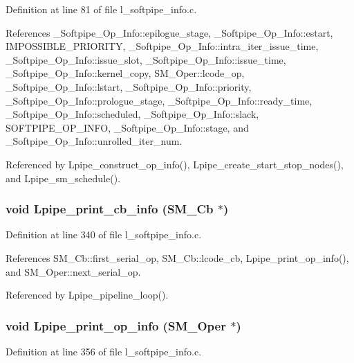Definition at line 81 of file l\_\-softpipe\_\-info.c.

References \_\-Softpipe\_\-Op\_\-Info::epilogue\_\-stage, \_\-Softpipe\_\-Op\_\-Info::estart, IMPOSSIBLE\_\-PRIORITY, \_\-Softpipe\_\-Op\_\-Info::intra\_\-iter\_\-issue\_\-time, \_\-Softpipe\_\-Op\_\-Info::issue\_\-slot, \_\-Softpipe\_\-Op\_\-Info::issue\_\-time, \_\-Softpipe\_\-Op\_\-Info::kernel\_\-copy, SM\_\-Oper::lcode\_\-op, \_\-Softpipe\_\-Op\_\-Info::lstart, \_\-Softpipe\_\-Op\_\-Info::priority, \_\-Softpipe\_\-Op\_\-Info::prologue\_\-stage, \_\-Softpipe\_\-Op\_\-Info::ready\_\-time, \_\-Softpipe\_\-Op\_\-Info::scheduled, \_\-Softpipe\_\-Op\_\-Info::slack, SOFTPIPE\_\-OP\_\-INFO, \_\-Softpipe\_\-Op\_\-Info::stage, and \_\-Softpipe\_\-Op\_\-Info::unrolled\_\-iter\_\-num.

Referenced by Lpipe\_\-construct\_\-op\_\-info(), Lpipe\_\-create\_\-start\_\-stop\_\-nodes(), and Lpipe\_\-sm\_\-schedule().
\subsubsection{\setlength{\rightskip}{0pt plus 5cm}void Lpipe\_\-print\_\-cb\_\-info (\bf{SM\_\-Cb} $\ast$)}\label{l__softpipe__info_8h_fbf960c17e0601b422b7f4e8869a621d}




Definition at line 340 of file l\_\-softpipe\_\-info.c.

References SM\_\-Cb::first\_\-serial\_\-op, SM\_\-Cb::lcode\_\-cb, Lpipe\_\-print\_\-op\_\-info(), and SM\_\-Oper::next\_\-serial\_\-op.

Referenced by Lpipe\_\-pipeline\_\-loop().
\subsubsection{\setlength{\rightskip}{0pt plus 5cm}void Lpipe\_\-print\_\-op\_\-info (\bf{SM\_\-Oper} $\ast$)}\label{l__softpipe__info_8h_f0e2cba88dd5514660ae4564c252f825}




Definition at line 356 of file l\_\-softpipe\_\-info.c.

